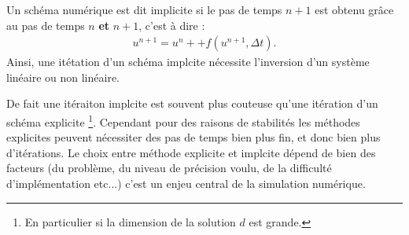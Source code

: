 \begin{definition}
    Un schéma numérique est dit implicite si le pas de temps $n+1$ est obtenu grâce au pas de temps $n$ \textbf{et} $n+1$, c'est à dire : 
    \begin{align}
        u^{n+1} = u^n + + f(u^{n+1} ,\Delta t ).
    \end{align}
    Ainsi, une itétation d'un schéma implcite nécessite l'inversion d'un système linéaire ou non linéaire. 
\end{definition}
De fait une itéraiton implcite est souvent plus couteuse qu'une itération d'un schéma explicite
\footnote{En particulier si la dimension de la solution $d$ est grande.}. 
Cependant pour des raisons de stabilités les méthodes explicites peuvent nécessiter des pas de temps bien plus fin, et donc bien plus d'itérations.
Le choix entre méthode explicite et implcite dépend de bien des facteurs (du problème, du niveau de précision voulu, de la difficulté d'implémentation etc...)
c'est un enjeu central de la simulation numérique.
